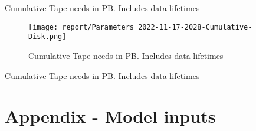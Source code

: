 \begin{table}[h]
\centering{}\label{Cumulative-Tape
}
\caption{Cumulative Tape needs in PB. Includes data lifetimes}
\end{table}
\begin{figure}[ht]
\centering\texttt{[image: report/Parameters\_2022-11-17-2028-Cumulative-Disk.png]}\label{Cumulative-Disk}
\caption{Cumulative Tape needs in PB. Includes data lifetimes}
\end{figure}
\begin{table}[h]
\centering{}\label{Cumulative-Disk
}
\caption{Cumulative Tape needs in PB. Includes data lifetimes}
\end{table}
\section{Appendix - Model inputs}


